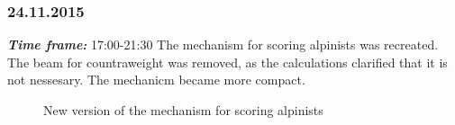 \subsubsection{24.11.2015}
\textit{\textbf{Time frame:}} 17:00-21:30 \newline
The mechanism for scoring alpinists was recreated. The beam for countraweight was removed, as the calculations clarified that it is not nessesary. The mechanicm became more compact.

\begin{figure}[H]
	\begin{minipage}[h]{1\linewidth}
		\caption{New version of the mechanism for scoring alpinists}
	\end{minipage}
\end{figure}

